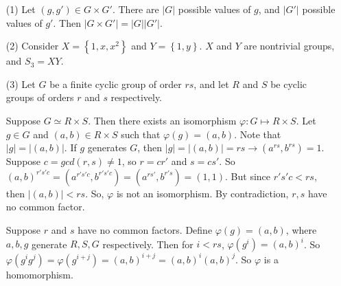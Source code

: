 %
%
\begin{itemize}
\item[(1)]
Let $(g, g') \in G \times G'$. There are $|G|$ possible values of $g$, and $|G'|$ possible values of $g'$. Then $|G \times G'| = |G||G'|$.
\item[(2)]
Consider $X = \left\lbrace 1, x, x^2 \right\rbrace$ and $Y = \left\lbrace 1, y \right\rbrace$. $X$ and $Y$ are nontrivial groups, and $S_3 = XY$.
\item[(3)]
Let $G$ be a finite cyclic group of order $rs$, and let $R$ and $S$ be cyclic groups of orders $r$ and $s$ respectively.

Suppose $G \simeq R \times S$. Then there exists an isomorphism $\varphi: G \mapsto R \times S$. Let $g \in G$ and $(a, b) \in R \times S$ such that $\varphi(g) = (a, b)$. Note that $|g| = |(a, b)|$. If $g$ generates $G$, then $|g| = |(a, b)| = rs \rightarrow (a^{rs}, b^{rs}) = 1$. Suppose $c = gcd(r, s) \neq 1$, so $r = cr'$ and $s = cs'$. So $(a, b)^{r's'c} = (a^{r's'c}, b^{r's'c}) = (a^{rs'}, b^{r's}) = (1, 1)$. But since $r's'c < rs$, then $|(a, b)| < rs$. So, $\varphi$ is not an isomorphism. By contradiction, $r, s$ have no common factor.

Suppose $r$ and $s$ have no common factors. Define $\varphi(g) = (a, b)$, where $a, b, g$ generate $R, S, G$ respectively. Then for $i < rs$, $\varphi(g^i) = (a, b)^i$. So $\varphi(g^ig^j) = \varphi(g^{i+j}) = (a, b)^{i + j} = (a, b)^i(a, b)^j$. So $\varphi$ is a homomorphism.


\end{itemize}
